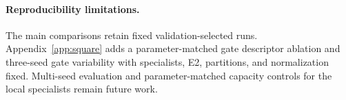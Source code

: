 \paragraph{Reproducibility limitations.}
The main comparisons retain fixed validation-selected runs. Appendix~\ref{app:square}
adds a parameter-matched gate descriptor ablation and three-seed gate variability
with specialists, E2, partitions, and normalization fixed. Multi-seed evaluation
and parameter-matched capacity controls for the local specialists remain future work.
